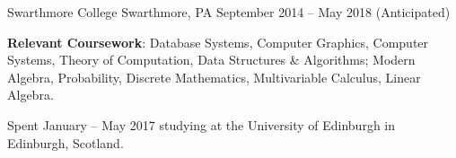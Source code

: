 

\begin{cventries}

    {Swarthmore College} %
    {Swarthmore, PA} %
    {September 2014 – May 2018 (Anticipated)} %
    {\begin{cvitems} %
      \item {\textbf{Relevant Coursework}: Database Systems, Computer Graphics,
        Computer Systems, Theory of Computation, Data Structures \& Algorithms;
        Modern Algebra, Probability, Discrete Mathematics, Multivariable
        Calculus, Linear Algebra.}
      \item {Spent January – May 2017 studying at the University of Edinburgh
        in Edinburgh, Scotland.}
    \end{cvitems}}
\end{cventries}
